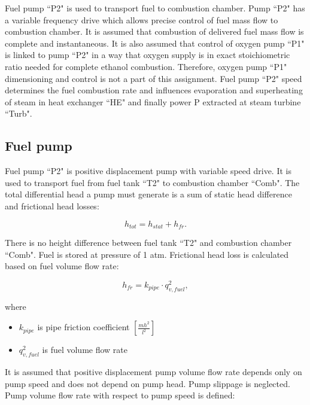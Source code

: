 \documentclass{article}
\begin{document}
	Fuel pump “P2" is used to transport fuel to combustion chamber. Pump “P2" has a variable frequency drive which allows precise control of fuel mass flow to combustion chamber. It is assumed that combustion of delivered fuel mass flow is complete and instantaneous. It is also assumed that control of oxygen pump “P1" is linked to pump “P2" in a way that oxygen supply is in exact stoichiometric ratio needed for complete ethanol combustion. Therefore, oxygen pump “P1" dimensioning and control is not a part of this assignment. 
	Fuel pump “P2" speed determines the fuel combustion rate and influences evaporation and superheating of steam in heat exchanger “HE" and finally power P extracted at steam turbine “Turb".
	
	\subsection*{Fuel pump}
	
	Fuel pump “P2" is positive displacement pump with variable speed drive. It is used to transport fuel from fuel tank “T2" to combustion chamber “Comb". The total differential head a pump must generate is a sum of static head difference and frictional head losses: 
	
	\begin{equation}\label{eq:head_total}
		h_{tot} = h_{stat} + h_{fr}.
	\end{equation}
	
	There is no height difference between fuel tank “T2" and combustion chamber “Comb". Fuel is stored at pressure of 1 atm.
	Frictional head loss is calculated based on fuel volume flow rate:
	
	\begin{equation}\label{eq:head_loss}
		h_{fr} = k_{pipe} \cdot q_{v,fuel}^2,
	\end{equation}
	
	\noindent
	where
	
	\begin{itemize}
		\item $k_{pipe}$ is pipe friction coefficient $\left[ \frac{mh^2}{l^2} \right]$
		\item $q_{v,fuel}^2$ is fuel volume flow rate
	\end{itemize}

	\noindent
	It is assumed that positive displacement pump volume flow rate depends only on pump speed and does not depend on pump head. Pump slippage is neglected. Pump volume flow rate with respect to pump speed is defined:
	
\end{document}
